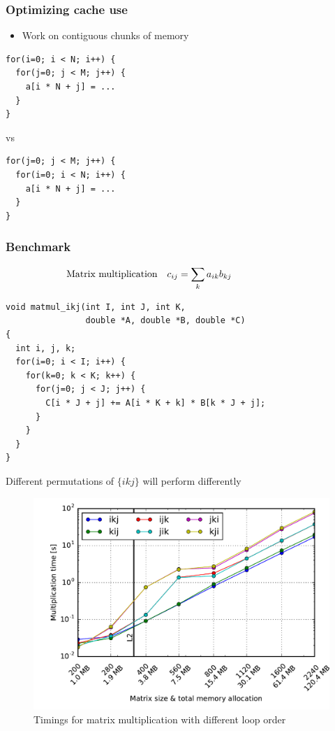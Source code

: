 \documentclass{beamer}
\begin{document}
\begin{frame}[fragile]
  \frametitle{Optimizing cache use}
  \begin{itemize}
  \item Work on contiguous chunks of memory
  \end{itemize}
\begin{lstlisting}
for(i=0; i < N; i++) {
  for(j=0; j < M; j++) {
    a[i * N + j] = ...
  }
}
\end{lstlisting}
vs
\begin{lstlisting}
for(j=0; j < M; j++) {
  for(i=0; i < N; i++) {
    a[i * N + j] = ...
  }
}
\end{lstlisting}
\end{frame}

\begin{frame}[fragile]
  \frametitle{Benchmark}
  \begin{align}
    \hspace{-2cm} \textrm{Matrix multiplication}\quad c_{ij} &= \sum_k a_{ik} b_{kj}\nonumber
  \end{align}
\begin{lstlisting}
void matmul_ikj(int I, int J, int K,
                double *A, double *B, double *C)
{
  int i, j, k;
  for(i=0; i < I; i++) {
    for(k=0; k < K; k++) {
      for(j=0; j < J; j++) {
        C[i * J + j] += A[i * K + k] * B[k * J + j];
      }
    }
  }
}
\end{lstlisting}
Different permutations of $\{ikj\}$ will perform differently
\end{frame}


\begin{frame}
  \begin{figure}
  \includegraphics[width=\textwidth]{code/timings-matmul}
  \caption{Timings for matrix multiplication with different loop order}
  \end{figure}
\end{frame}
\end{document}
